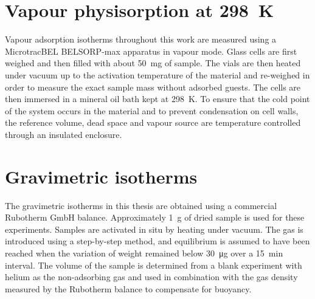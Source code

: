\section{Vapour physisorption at \SI{298}{\kelvin}}\label{appx:char:vapourphys}

Vapour adsorption isotherms throughout this work are measured
using a MicrotracBEL BELSORP-max apparatus in vapour mode.
Glass cells are first weighed and then filled with about
\SI{50}{\milli\gram} of sample. The vials are then heated
under vacuum up to the activation temperature of the material
and re-weighed in order to measure the exact sample mass
without adsorbed guests. The cells are then immersed in a
mineral oil bath kept at \SI{298}{\kelvin}. To ensure that the 
cold point of the system occurs in the material and to 
prevent condensation on cell walls, the reference volume, dead space 
and vapour source are temperature controlled through an
insulated enclosure.

\section{Gravimetric isotherms}\label{appx:char:gravimetry}

The gravimetric isotherms in this thesis are obtained 
using a commercial Rubotherm GmbH balance. Approximately 
\SI{1}{\gram} of dried sample is used for these experiments. 
Samples are activated in situ by heating under vacuum. 
The gas is introduced using a step-by-step method, and equilibrium is
assumed to have been reached when the variation of weight remained
below \SI{30}{\micro\gram} over a \SI{15}{\minute} interval. 
The volume of the sample is determined from a blank experiment 
with helium as the non-adsorbing
gas and used in combination with the gas density measured by the
Rubotherm balance to compensate for buoyancy.
